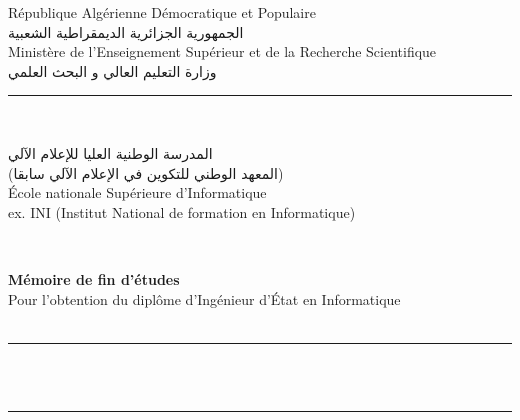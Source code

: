 
\begin{titlepage}
    \centering
    {\small République Algérienne Démocratique et Populaire}\\
    {\small الجمهورية الجزائرية الديمقراطية الشعبية}\\
    {\small Ministère de l'Enseignement Supérieur et de la Recherche Scientifique}\\
    {\small وزارة التعليم العالي و البحث العلمي}\\
    \rule{\linewidth}{0.3mm} \\[0.4cm]

    \begin{minipage}{5cm}
        \begin{center}
        \end{center}
    \end{minipage}\hfill
    \begin{minipage}{10cm}
        \begin{flushright}
            {\small المدرسة الوطنية العليا للإعلام الآلي}\\
            {\small (المعهد الوطني للتكوين في الإعلام الآلي سابقا)}\\
            {\small École nationale Supérieure d'Informatique}\\[0.1cm]
            {\small ex. INI (Institut National de formation en Informatique)}\\[0.1cm]
        \end{flushright}
    \end{minipage}\hfill\\
    \vspace{20mm}

    {\large \bfseries Mémoire de fin d'études}\\[0.5cm]
    {\large Pour l'obtention du diplôme d'Ingénieur d'État en Informatique}\\[0.5cm]
    {\large \bfseries \documentOption \\ }
    \vspace{10mm}

    \rule{\linewidth}{0.3mm} \\[0.4cm]
    { \huge \bfseries \documentTitle\\[0.4cm] }
    \rule{\linewidth}{0.3mm} \\[1cm]
    \vspace{10mm}


\end{titlepage}
